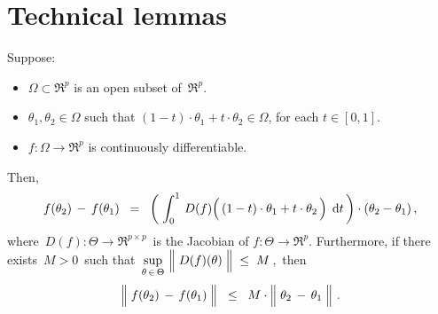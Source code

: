 

\section{Technical lemmas}
\setcounter{theorem}{0}
\setcounter{equation}{0}


\renewcommand{\theenumi}{\roman{enumi}}
\renewcommand{\labelenumi}{\textnormal{(\theenumi)}$\;\;$}


\begin{lemma}
\label{FTCRpRp}
\mbox{}\vskip 0.1cm
\noindent
Suppose:
\begin{itemize}
\item
	$\Omega \subset \Re^{p}$ is an open subset of \,$\Re^{p}$.
\item
	$\theta_{1}, \theta_{2} \in \Omega$ such that $(1-t) \cdot \theta_{1} + t \cdot \theta_{2} \in \Omega$, for each $t \in [0,1]$.
\item
	$f : \Omega \longrightarrow \Re^{p}$ is continuously differentiable.
\end{itemize}
Then,
\begin{equation*}
f(\theta_{2}) \, - \, f(\theta_{1})
\;\; = \;\;
	\left(\;\int_{0}^{1}\, D(f)\!\left(\,(1-t)\cdot \theta_{1} \overset{{\color{white}.}}{+} t \cdot \theta_{2} \,\right) \;\d t\,\right)
	\cdot (\theta_{2} - \theta_{1})\,,
\end{equation*}
where \,$D(f) : \Theta \longrightarrow \Re^{p \times p}$\,
is the Jacobian of $f : \Theta \longrightarrow \Re^{p}$.
Furthermore, if there exists \,$M > 0$\, such that
\,$\underset{\theta\,\in\,\Theta}{\sup}\,\left\Vert\;\overset{{\color{white}.}}{D}(f)(\theta)\;\right\Vert \;\leq\; M$\,,\,
then
\begin{equation*}
\left\Vert\; f(\theta_{2}) \, \overset{{\color{white}.}}{-} \, f(\theta_{1}) \;\right\Vert
\;\; \leq \;\;
	M %
	\cdot
	\left\Vert\; \theta_{2} \,\overset{{\color{white}.}}{-}\, \theta_{1} \;\right\Vert\,.
\end{equation*}
\end{lemma}
